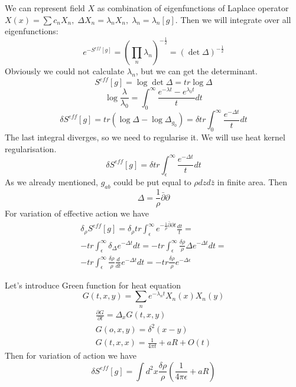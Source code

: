 \documentclass[a4paper,12pt]{article}
\theoremstyle{definition} \newtheorem{Def}{Definition}
\begin{document}
We can represent field $X$ as combination of eigenfunctions of Laplace operator $X(x)=\sum c_n X_n,\; \Delta X_n = \lambda_n X_n,\; \lambda_n=\lambda_n[g]$. Then we will integrate over all eigenfunctions:
\begin{equation}
  \label{eq:36}
  e^{-S^{eff}[g]}=\left(\prod_{n} \lambda_n\right)^{-\frac{1}{2}}=(\det \Delta)^{-\frac{1}{2}}
\end{equation}
Obviously we could not calculate $\lambda_n$, but we can get the determinant.
\begin{equation}
  \label{eq:37}
  S^{eff}[g]=\log \det \Delta=tr \log \Delta
\end{equation}
\begin{equation}
  \label{eq:38}
  \log\frac{\lambda}{\lambda_0}=\int_0^{\infty}\frac{e^{-\lambda t}-e^{\lambda_0 t}}{t}dt
\end{equation}
\begin{equation}
  \label{eq:39}
  \delta S^{eff}[g]=tr (\log\Delta -\log\Delta_{g_0})=\delta tr \int_0^{\infty}\frac{e^{-\Delta t}}{t} dt
\end{equation}
The last integral diverges, so we need to regularise it. We will use heat kernel regularisation.
\begin{equation}
  \label{eq:40}
  \delta S^{eff}[g]=\delta tr \int_{\epsilon}^{\infty}\frac{e^{-\Delta t}}{t} dt  
\end{equation}
As we already mentioned, $\hat{g}_{ab}$ could be put equal to $\rho dz d\bar{z}$ in finite area. Then
\begin{equation}
  \label{eq:41}
  \Delta=\frac{1}{\rho}\bar{\partial}\partial
\end{equation}
For variation of effective action we have
  \begin{multline}
  \label{eq:42}
    \delta_{\rho}S^{eff}[g]=\delta_{\rho} tr \int_{\epsilon}^{\infty} e^{-\frac{1}{\rho}\bar{\partial}\partial t}\frac{dt}{t}=\\
    - tr \int_{\epsilon}^{\infty}\delta_{\Delta}e^{-\Delta t} dt=
    -tr \int_{\epsilon}^{\infty}\frac{\delta\rho}{\rho}\Delta e^{-\Delta t} dt=\\
    -tr \int_{\epsilon}^{\infty}\frac{\delta\rho}{\rho}\frac{d}{dt} e^{-\Delta t} dt=-tr \frac{\delta\rho}{\rho}e^{-\Delta \epsilon}
  \end{multline}

Let's introduce Green function for heat equation
\begin{equation}
  \label{eq:43}
  G(t,x,y)=\sum_n e^{-\lambda_n t}X_n(x) X_n(y)
\end{equation}
\begin{equation}
  \label{eq:44}
  \begin{split}
    \frac{\partial G}{\partial t}=\Delta_x G(t,x,y)\\
    G(o,x,y)=\delta^2 (x-y)\\
    G(t,x,x)=\frac{1}{4\pi t}+aR+O(t)
  \end{split}
\end{equation}
Then for variation of action we have
\begin{equation}
  \label{eq:45}
  \delta S^{eff}[g]=\int d^2x \frac{\delta\rho}{\rho}\left(\frac{1}{4\pi\epsilon}+aR\right)
\end{equation}
\end{document}

